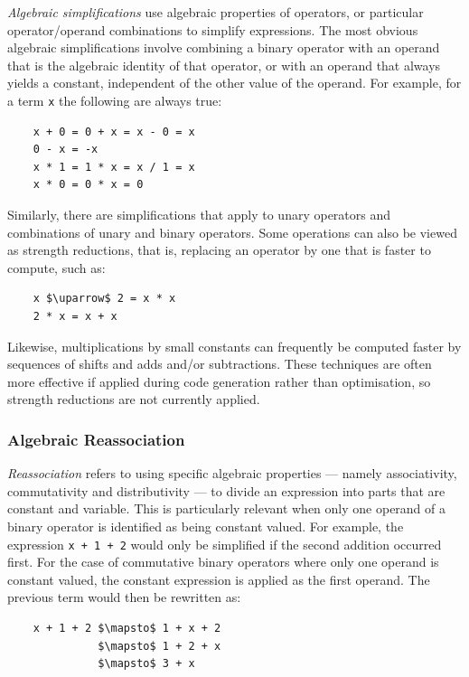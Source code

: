 \emph{Algebraic simplifications} use algebraic properties of operators, or
particular operator/operand combinations to simplify expressions. The most
obvious algebraic simplifications involve combining a binary operator with an
operand that is the algebraic identity of that operator, or with an operand that
always yields a constant, independent of the other value of the operand. For
example, for a term \texttt{x} the following are always true:
%
\begin{lstlisting}[style=Haskell,numbers=none]
%\bf$\langle$ algebraic simplification $\rangle$%
    x + 0 = 0 + x = x - 0 = x
    0 - x = -x
    x * 1 = 1 * x = x / 1 = x
    x * 0 = 0 * x = 0
\end{lstlisting}
%
Similarly, there are simplifications that apply to unary operators and
combinations of unary and binary operators. Some operations can also be viewed
as strength reductions, that is, replacing an operator by one that is faster to
compute, such as:
%
\begin{lstlisting}[style=Haskell,numbers=none,mathescape]
%\bf$\langle$ strength reduction $\rangle$%
    x $\uparrow$ 2 = x * x
    2 * x = x + x
\end{lstlisting}
%
Likewise, multiplications by small constants can frequently be computed faster
by sequences of shifts and adds and/or subtractions. These techniques are often
more effective if applied during code generation rather than optimisation, so
strength reductions are not currently applied.


\subsubsection{Algebraic Reassociation}

\emph{Reassociation} refers to using specific algebraic properties --- namely
associativity, commutativity and distributivity --- to divide an expression into
parts that are constant and variable.
This is particularly relevant when only one operand of a binary
operator is identified as being constant valued. For example, the expression
\lstinline{x + 1 + 2} would only be simplified if the second addition occurred
first. For the case of commutative binary operators where only one operand is
constant valued, the constant expression is applied as the first operand. The
previous term would then be rewritten as:
%
\begin{lstlisting}[style=Haskell,numbers=none,mathescape]
%\bf$\langle$ algebraic reassociation $\rangle$%
    x + 1 + 2 $\mapsto$ 1 + x + 2
              $\mapsto$ 1 + 2 + x
              $\mapsto$ 3 + x
\end{lstlisting}


